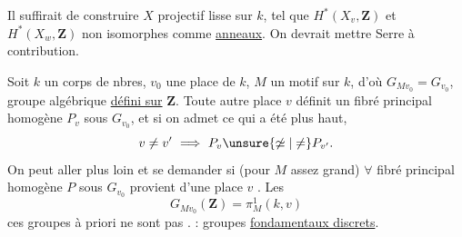 Il suffirait de construire $X$ projectif lisse sur $k$, tel que $H^*(X_v,\mathbf Z)$ et $H^*(X_w,\mathbf Z)$ non isomorphes comme \uline{anneaux}. On devrait mettre Serre à contribution.

Soit $k$ un corps de nbres, $v_0$ une place de $k$, $M$ un motif sur $k$, d'où $G_{Mv_0}=G_{v_0}$, groupe algébrique \uline{défini sur} $\mathbf Z$. Toute autre place  $v$ définit un fibré principal homogène $P_v$ sous $G_{v_0}$, et si on admet ce qui a été  plus haut, 
\[
v\ne v'\ \Longrightarrow\ P_v\unsure{\not\simeq|\ne}P_{v'}.
\]
On peut aller plus loin et se demander si  (pour $M$ assez grand) \uline{$\forall$} fibré principal homogène $P$ sous $G_{v_0}$ provient d'une place $v$ .
Les  
\[
G_{Mv_0}(\mathbf Z)=\pi^1_M(k,v)
\]
ces groupes à priori ne sont pas .
: groupes \uline{fondamentaux  discrets}.
